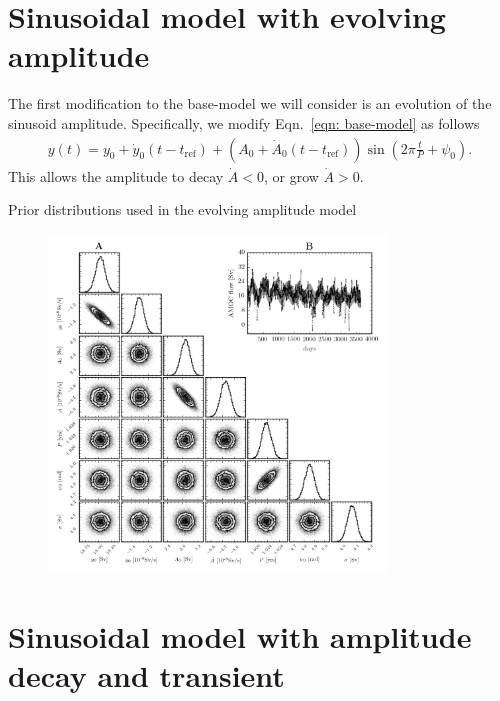 \documentclass{article}
\newcommand{\tref}{t_{\textrm{ref}}}
\begin{document}
\section{Sinusoidal model with evolving amplitude}

The first modification to the base-model we will consider is an evolution of
the sinusoid amplitude.
Specifically, we modify Eqn.~\eqref{eqn: base-model} as follows
\begin{align}
y(t) = y_0 + \dot{y}_0(t - \tref) +
(A_0 + \dot{A}_0(t-\tref)) \sin\left(2\pi \frac{t}{P} + \psi_0\right).
\label{eqn: decay amplitude}
\end{align}
This allows the amplitude to decay $\dot{A} < 0$, or grow $\dot{A} > 0$.

\begin{table}[htb]
\centering
\caption{Prior distributions used in the evolving amplitude model}
\label{tab: base-model}

\end{table}

\begin{figure}[htb]
\centering
\includegraphics[width=0.8\textwidth]{img/BasicSinusoidAmplitudeDecay_PosteriorWithFit}
\caption{}
\label{fig:}
\end{figure}

\section{Sinusoidal model with amplitude decay and transient}
\end{document}
